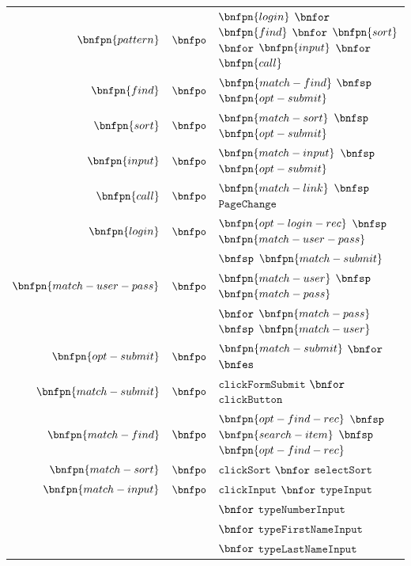 \documentclass[10pt, conference, compsocconf]{IEEEtran}
\begin{document}
\begin{table}[!htb]
\begin{tabular}{rcl}
  $\bnfpn{pattern}$ & $\bnfpo$ & $\bnfpn{login}$ $\bnfor$ $\bnfpn{find}$ $\bnfor$ $\bnfpn{sort}$ $\bnfor$ $\bnfpn{input}$ $\bnfor$ $\bnfpn{call}$ \\
  
  $\bnfpn{find}$  & $\bnfpo$ &  $\bnfpn{match-find}$ $\bnfsp$ $\bnfpn{opt-submit}$ \\
  
  $\bnfpn{sort}$ & $\bnfpo$ &  $\bnfpn{match-sort}$ $\bnfsp$ $\bnfpn{opt-submit}$ \\
  
  $\bnfpn{input}$ & $\bnfpo$ &  $\bnfpn{match-input}$ $\bnfsp$ $\bnfpn{opt-submit}$ \\
  
  $\bnfpn{call}$ & $\bnfpo$ &  $\bnfpn{match-link}$ $\bnfsp$ $\texttt{PageChange}$ \\
  
  $\bnfpn{login}$ & $\bnfpo$ &  $\bnfpn{opt-login-rec}$ $\bnfsp$ $\bnfpn{match-user-pass}$\\
  & & $\bnfsp$ $\bnfpn{match-submit}$ \\
  
  $\bnfpn{match-user-pass}$ & $\bnfpo$ &  $\bnfpn{match-user}$ $\bnfsp$ $\bnfpn{match-pass}$ \\
  & & $\bnfor$ $\bnfpn{match-pass}$ $\bnfsp$ $\bnfpn{match-user}$ \\
  
  $\bnfpn{opt-submit}$ & $\bnfpo$ &  $\bnfpn{match-submit}$ $\bnfor$ $\bnfes$ \\
  
  $\bnfpn{match-submit}$ & $\bnfpo$ &  $\texttt{clickFormSubmit}$ $\bnfor$ $\texttt{clickButton}$ \\
  
  $\bnfpn{match-find}$ & $\bnfpo$ &  $\bnfpn{opt-find-rec}$ $\bnfsp$ $\bnfpn{search-item}$ $\bnfsp$ $\bnfpn{opt-find-rec}$ \\
  
  $\bnfpn{match-sort}$ & $\bnfpo$ &  $\texttt{clickSort}$ $\bnfor$ $\texttt{selectSort}$ \\
  
  $\bnfpn{match-input}$ & $\bnfpo$ &  $\texttt{clickInput}$ $\bnfor$ $\texttt{typeInput}$ \\
  & & $\bnfor$ $\texttt{typeNumberInput}$ \\ 
  & & $\bnfor$ $\texttt{typeFirstNameInput}$ \\
  & & $\bnfor$ $\texttt{typeLastNameInput}$ \\
  

\end{tabular}
\end{table}
\end{document}
